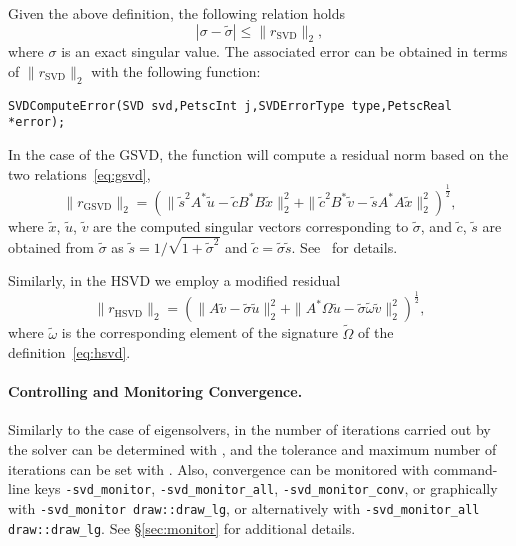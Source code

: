 Given the above definition, the following relation holds
\begin{equation}
|\sigma-\tilde{\sigma}|\leq \|r_\mathrm{SVD}\|_2,
\end{equation}
where $\sigma$ is an exact singular value. The associated error can be obtained in terms of $\|r_\mathrm{SVD}\|_2$ with the following function:
        \begin{Verbatim}[fontsize=\small]
        SVDComputeError(SVD svd,PetscInt j,SVDErrorType type,PetscReal *error);
        \end{Verbatim}

In the case of the GSVD, the function  will compute a residual norm based on the two relations~\eqref{eq:gsvd},
\begin{equation}
\|r_\mathrm{GSVD}\|_2=\left(\|\tilde{s}^2A^*\tilde{u}-\tilde{c}B^*B\tilde{x}\|_2^2+\|\tilde{c}^2B^*\tilde{v}-\tilde{s}A^*A\tilde{x}\|_2^2\right)^{\frac{1}{2}},
\end{equation}
where $\tilde{x}$, $\tilde{u}$, $\tilde{v}$ are the computed singular vectors corresponding to $\tilde{\sigma}$, and $\tilde{c}$, $\tilde{s}$ are obtained from $\tilde{\sigma}$ as $\tilde{s}=1/\sqrt{1+\tilde{\sigma}^2}$ and $\tilde{c}=\tilde{\sigma}\tilde{s}$. See~\citep{Alvarruiz:2024:TRL} for details.

Similarly, in the HSVD we employ a modified residual
\begin{equation}
\|r_\mathrm{HSVD}\|_2=\left(\|A\tilde{v}-\tilde{\sigma}\tilde{u}\|_2^2+\|A^*\Omega\tilde{u}-\tilde{\sigma}\tilde{\omega}\tilde{v}\|_2^2\right)^{\frac{1}{2}},
\end{equation}
where $\tilde\omega$ is the corresponding element of the signature $\tilde\Omega$ of the definition~\eqref{eq:hsvd}.

\paragraph{Controlling and Monitoring Convergence.}

Similarly to the case of eigensolvers, in  the number of iterations carried out by the solver can be determined with , and the tolerance and maximum number of iterations can be set with . Also, convergence can be monitored with command-line keys \Verb!-svd_monitor!, \Verb!-svd_monitor_all!, \Verb!-svd_monitor_conv!, or graphically with \Verb!-svd_monitor draw::draw_lg!, or alternatively with \Verb!-svd_monitor_all draw::draw_lg!. See \S\ref{sec:monitor} for additional details.

